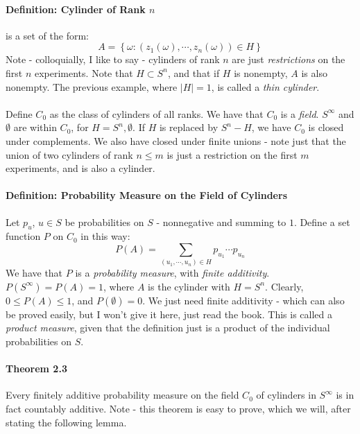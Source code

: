 \documentclass[12pt,a4paper]{article}
\newcommand{\1}[1]{\mathbbm{1}\left\{ #1 \right\}}
\begin{document}
\paragraph{Definition: Cylinder of Rank $n$} is a set of the form:
$$
	A = \left\{\omega : (z_1(\omega), \cdots, z_n(\omega)) \in H\right\}
$$
Note - colloquially, I like to say - cylinders of rank $n$ are just \textit{restrictions} on the first $n$ experiments. Note that $H \subset S^n$, and that if $H$ is nonempty, $A$ is also nonempty. The previous example, where $|H| = 1$, is called a \textit{thin cylinder}.
\\\\
Define $C_0$ as the class of cylinders of all ranks. We have that $C_0$ is a \textit{field}. $S^\infty$ and $\emptyset$ are within $C_0$, for $H = S^n,\emptyset$. If $H$ is replaced by $S^n - H$, we have $C_0$ is closed under complements. We also have closed under finite unions - note just that the union of two cylinders of rank $n \leq m$ is just a restriction on the first $m$ experiments, and is also a cylinder.

\paragraph{Definition: Probability Measure on the Field of Cylinders} Let $p_u$, $u \in S$ be probabilities on $S$ - nonnegative and summing to $1$. Define a set function $P$ on $C_0$ in this way:
$$
	P(A) = \sum_{(u_1, \cdots, u_n) \in H} p_{u_1} \cdots p_{u_n}
$$
We have that $P$ is a \textit{probability measure}, with \textit{finite additivity}. $P(S^\infty) = P(A) = 1$, where $A$ is the cylinder with $H = S^n$. Clearly, $0 \leq P(A) \leq 1$, and $P(\emptyset) = 0$. We just need finite additivity - which can also be proved easily, but I won't give it here, just read the book. This is called a \textit{product measure}, given that the definition just is a product of the individual probabilities on $S$.

\paragraph{Theorem 2.3} Every finitely additive probability measure on the field $C_0$ of cylinders in $S^\infty$ is in fact countably additive. Note - this theorem is easy to prove, which we will, after stating the following lemma.
\end{document}
